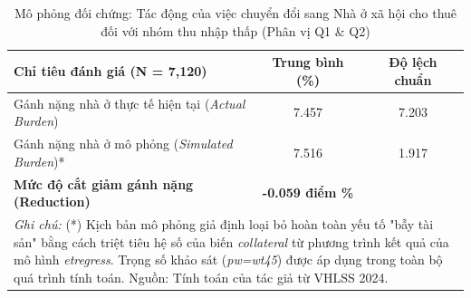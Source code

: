 \documentclass[12pt,a4paper]{report}
\begin{document}
\begin{table}[htbp]
	\centering
	\caption{Mô phỏng đối chứng: Tác động của việc chuyển đổi sang Nhà ở xã hội cho thuê đối với nhóm thu nhập thấp (Phân vị Q1 \& Q2)}
	\label{tab:policy_simulation}
	\renewcommand{\arraystretch}{1.3}
	\begin{tabular}{lcc}
		\toprule
		\textbf{Chỉ tiêu đánh giá (N = 7,120)} & \textbf{Trung bình (\%)} & \textbf{Độ lệch chuẩn} \\
		\midrule
		Gánh nặng nhà ở thực tế hiện tại (\textit{Actual Burden}) & 7.457 & 7.203 \\
		Gánh nặng nhà ở mô phỏng (\textit{Simulated Burden})* & 7.516 & 1.917 \\
		\midrule
		\textbf{Mức độ cắt giảm gánh nặng (Reduction)} & \textbf{-0.059 điểm \%} & \\
		\bottomrule
		\multicolumn{3}{p{12cm}}{\footnotesize \textit{Ghi chú:} (*) Kịch bản mô phỏng giả định loại bỏ hoàn toàn yếu tố "bẫy tài sản" bằng cách triệt tiêu hệ số của biến \textit{collateral} từ phương trình kết quả của mô hình \textit{etregress}. Trọng số khảo sát (\textit{pw=wt45}) được áp dụng trong toàn bộ quá trình tính toán. Nguồn: Tính toán của tác giả từ VHLSS 2024.}
	\end{tabular}
\end{table}

\newpage
\printbibliography
{}

\end{document}
